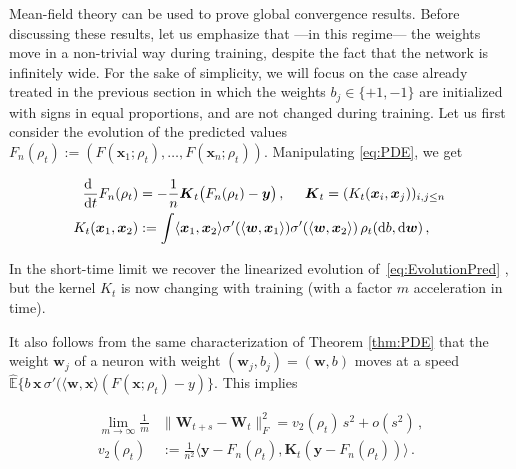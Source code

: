 Mean-field theory can be used to prove global convergence results. Before discussing these results, let us emphasize that ---in this regime---  the weights move in a non-trivial way during training, despite the fact that the network is infinitely wide. For the sake of simplicity, we will focus on the case already treated in the previous section in which the weights
  $b_j\in\{+1,-1\}$ are initialized with signs in equal proportions, and are not changed during training. Let us first consider the evolution of the predicted values $F_n(\rho_t) :=(F({\boldsymbol x}_1;\rho_t),\dots ,F({\boldsymbol x}_n;\rho_t))$.
  Manipulating \eqref{eq:PDE}, we get 

  \begin{align}
    \frac{{\rm d}\phantom{t}}{{\rm d} t}F_n(\rho_t) &= -\frac{1}{n}{\boldsymbol K}_t \big(F_n(\rho_t)-{\boldsymbol y}\big)\, ,\;\;\;\;\; {\boldsymbol K}_t = (K_t({\boldsymbol x}_i,{\boldsymbol x}_j))_{i,j\le n}\,\\
    K_t({\boldsymbol x}_1,{\boldsymbol x}_2)& := \int \langle{\boldsymbol x}_1,{\boldsymbol x}_2\rangle\sigma'(\langle{\boldsymbol w},{\boldsymbol x}_1\rangle) \sigma'(\langle{\boldsymbol w},{\boldsymbol x}_2\rangle)\, \rho_t({\rm d} b,{\rm d}{\boldsymbol w})\, ,
    \label{eq:EvolutionPredictedMinfty}
  \end{align}

  In the short-time limit we recover the linearized evolution of~\eqref{eq:EvolutionPred}
  \cite{mei2019mean}, but the kernel $K_t$ is now changing with training (with a factor $m$ acceleration in time).

  It also follows from the same characterization of Theorem
  \ref{thm:PDE} that the weight ${\boldsymbol w}_j$ of a neuron with weight
  $({\boldsymbol w}_j,b_j) = ({\boldsymbol w},b)$ moves at a speed $\widehat{{\mathbb E}}\{b\,{\boldsymbol x}\,\sigma'(\langle{\boldsymbol w},{\boldsymbol x}\rangle(F({\boldsymbol x};\rho_t)-y)\}$.
  This implies

  \begin{align}

    \lim_{m\to\infty}\frac{1}{m}&\big\|{\boldsymbol W}_{t+s}-{\boldsymbol W}_t\|_F^2 = v_2(\rho_t)\, s^2+o(s^2)\, ,\label{eq:WeightChangeMF}\\
    v_2(\rho_t)&:= \frac{1}{n^2} \langle{\boldsymbol y}-F_n(\rho_t),{\boldsymbol K}_{t}({\boldsymbol y}-F_n(\rho_t))\rangle\, .

  \end{align}

